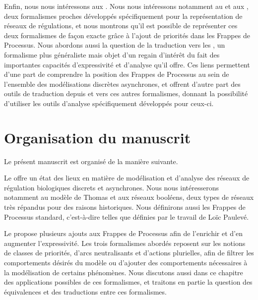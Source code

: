 Enfin, nous nous intéressons aux .
Nous nous intéressons notamment au  et aux ,
deux formalismes proches
développés spécifiquement pour la représentation de réseaux de régulations,
et nous montrons qu'il est possible de représenter ces deux formalismes de façon exacte
grâce à l'ajout de priorités dans les Frappes de Processus.
Nous abordons aussi la question de la traduction vers les ,
un formalisme plus généraliste mais objet d'un regain d'intérêt du fait des importantes
capacités d'expressivité et d'analyse qu'il offre. 
Ces liens permettent d'une part de comprendre la position des Frappes de Processus au sein
de l'ensemble des modélisations discrètes asynchrones,
et offrent d'autre part des outils de traduction depuis et vers ces autres formalismes,
donnant la possibilité d'utiliser les outils d'analyse spécifiquement développés pour ceux-ci.



\section{Organisation du manuscrit}

Le présent manuscrit est organisé de la manière suivante.

Le  offre un état des lieux en matière de modélisation et d'analyse
des réseaux de régulation biologiques discrets et asynchrones.
Nous nous intéresserons notamment au modèle de Thomas et aux réseaux booléens,
deux types de réseaux très répandus pour des raisons historiques.
Nous définirons aussi les Frappes de Processus standard,
c'est-à-dire telles que définies par le travail de Loïc Paulevé.

Le  propose plusieurs ajouts aux Frappes de Processus afin de l'enrichir
et d'en augmenter l'expressivité.
Les trois formalismes abordés reposent sur les notions de classes de priorités,
d'arcs neutralisants et d'actions plurielles,
afin de filtrer les comportements désirés du modèle
ou d'ajouter des comportements nécessaires à la modélisation de certains phénomènes.
Nous discutons aussi dans ce chapitre des applications possibles de ces formalismes,
et traitons en partie la question des équivalences et des traductions entre ces formalismes.

